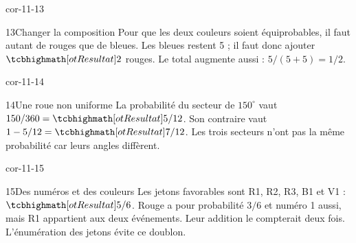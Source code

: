 \begin{blocLivre}{cor-11-13}\begin{corrige}{13}{Changer la composition}
Pour que les deux couleurs soient équiprobables, il faut autant de rouges que de bleues. Les bleues restent 5 ; il faut donc ajouter $\res2$ rouges. Le total augmente aussi : $5/(5+5)=1/2$.
\end{corrige}\end{blocLivre}
\begin{blocLivre}{cor-11-14}\begin{corrige}{14}{Une roue non uniforme}
La probabilité du secteur de $150^\circ$ vaut $150/360=\res{5/12}$. Son contraire vaut $1-5/12=\res{7/12}$. Les trois secteurs n’ont pas la même probabilité car leurs angles diffèrent.
\label{fig-cor-11-14}
\end{corrige}\end{blocLivre}
\begin{blocLivre}{cor-11-15}\begin{corrige}{15}{Des numéros et des couleurs}
Les jetons favorables sont R1, R2, R3, B1 et V1 : $\res{5/6}$. Rouge a pour probabilité $3/6$ et numéro 1 aussi, mais R1 appartient aux deux événements. Leur addition le compterait deux fois. L’énumération des jetons évite ce doublon.
\label{fig-cor-11-15}
\end{corrige}\end{blocLivre}
